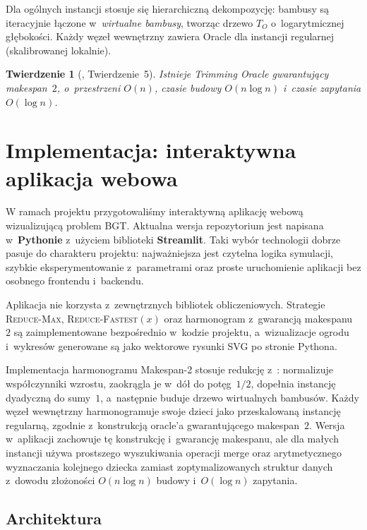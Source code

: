 \documentclass[12pt,a4paper]{article}
\theoremstyle{plain}
\newtheorem{twierdzenie}{Twierdzenie}[section]
\theoremstyle{definition}
\theoremstyle{remark}
\newcommand{\RF}{\textsc{Reduce-Fastest}}
\newcommand{\RM}{\textsc{Reduce-Max}}
\begin{document}
Dla ogólnych instancji stosuje się hierarchiczną dekompozycję:
bambusy są iteracyjnie łączone w~\emph{wirtualne bambusy}, tworząc
drzewo $T_O$ o~logarytmicznej głębokości. Każdy węzeł wewnętrzny
zawiera Oracle dla instancji regularnej (skalibrowanej lokalnie).

\begin{twierdzenie}[\cite{bilo2022}, Twierdzenie~5]\label{thm:oracle-opt}
Istnieje Trimming Oracle gwarantujący makespan~$2$, o~przestrzeni $O(n)$,
czasie budowy $O(n \log n)$ i~czasie zapytania $O(\log n)$.
\end{twierdzenie}

\section{Implementacja: interaktywna aplikacja webowa}

W ramach projektu przygotowaliśmy interaktywną aplikację webową
wizualizującą problem BGT. Aktualna wersja repozytorium jest napisana
w~\textbf{Pythonie} z~użyciem biblioteki \textbf{Streamlit}. Taki wybór
technologii dobrze pasuje do charakteru projektu: najważniejsza jest
czytelna logika symulacji, szybkie eksperymentowanie z~parametrami oraz
proste uruchomienie aplikacji bez osobnego frontendu i~backendu.

Aplikacja nie korzysta z~zewnętrznych bibliotek obliczeniowych. Strategie
\RM{}, \RF$(x)$ oraz harmonogram z~gwarancją makespanu~$2$ są zaimplementowane bezpośrednio
w~kodzie projektu, a~wizualizacje ogrodu i~wykresów generowane są jako
wektorowe rysunki SVG po stronie Pythona.

Implementacja harmonogramu Makespan-2 stosuje redukcję z~\cite{bilo2022}:
normalizuje współczynniki wzrostu, zaokrągla je w~dół do potęg~$1/2$,
dopełnia instancję dyadyczną do sumy~$1$, a~następnie buduje drzewo
wirtualnych bambusów. Każdy węzeł wewnętrzny harmonogramuje swoje dzieci
jako przeskalowaną instancję regularną, zgodnie z~konstrukcją oracle'a
gwarantującego makespan~$2$. Wersja w~aplikacji zachowuje tę konstrukcję
i~gwarancję makespanu, ale dla małych instancji używa prostszego
wyszukiwania operacji merge oraz arytmetycznego wyznaczania kolejnego
dziecka zamiast zoptymalizowanych struktur danych z~dowodu złożoności
$O(n\log n)$ budowy i~$O(\log n)$ zapytania.

\subsection{Architektura}
\end{document}

